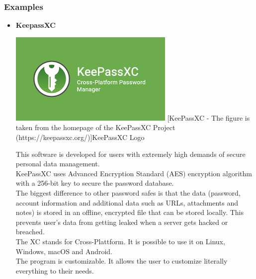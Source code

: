 \documentclass[conference]{IEEEtran}
\begin{document}
\subsubsection{Examples}
\begin{itemize}
\item \textbf{KeepassXC}\cite{b6}\\ 
\begin{center}
\includegraphics[scale=0.6]{./images/KeePass.png}
[KeePassXC - The figure is taken from the homepage of the KeePassXC Project (https://keepassxc.org/)]{KeePassXC Logo}
\end{center}

This software is developed for users with extremely high demands of secure personal data management. \\
KeePassXC uses Advanced Encryption Standard (AES) encryption algorithm with a 256-bit key to secure the password database.\\
The biggest difference to other password safes is that the data (password, account information and additional data such as URLs, attachments and notes) is stored in an offline, encrypted file that can be stored locally. This prevents user's data from getting leaked when a server gets hacked or breached.\\
The XC stands for Cross-Plattform. It is possible to use it on Linux, Windows, macOS and Android.\\
The program is customizable. It allows the user to customize literally everything to their needs.\\



\end{itemize}
\end{document}
